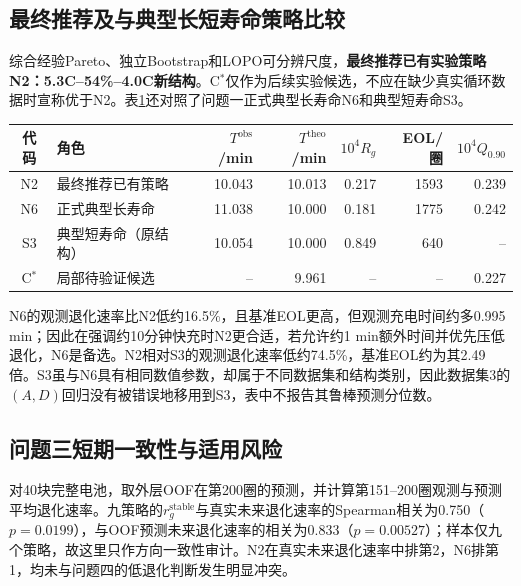 \documentclass[withoutpreface]{cumcmthesis}
\begin{document}
\subsection{最终推荐及与典型长短寿命策略比较}

综合经验Pareto、独立Bootstrap和LOPO可分辨尺度，\textbf{最终推荐已有实验策略N2：5.3C--54\%--4.0C新结构}。C$^*$仅作为后续实验候选，不应在缺少真实循环数据时宣称优于N2。表\ref{tab:q4recommend}还对照了问题一正式典型长寿命N6和典型短寿命S3。

\begin{table}[H]
\centering
\footnotesize
{}
\begin{tabular}{clrrrrr}
\toprule
\rowcolor{TableHeader}
代码 & 角色 & $T^{\mathrm{obs}}$/min & $T^{\mathrm{theo}}$/min & $10^4R_g$ & EOL/圈 & $10^4Q_{0.90}$ \\
\midrule
N2 & 最终推荐已有策略 & 10.043 & 10.013 & 0.217 & 1593 & 0.239 \\
N6 & 正式典型长寿命 & 11.038 & 10.000 & 0.181 & 1775 & 0.242 \\
S3 & 典型短寿命（原结构） & 10.054 & 10.000 & 0.849 & 640 & -- \\
C$^*$ & 局部待验证候选 & -- & 9.961 & -- & -- & 0.227 \\
\bottomrule
\end{tabular}
\label{tab:q4recommend}
\end{table}

N6的观测退化速率比N2低约16.5\%，且基准EOL更高，但观测充电时间约多0.995 min；因此在强调约10分钟快充时N2更合适，若允许约1 min额外时间并优先压低退化，N6是备选。N2相对S3的观测退化速率低约74.5\%，基准EOL约为其2.49倍。S3虽与N6具有相同数值参数，却属于不同数据集和结构类别，因此数据集3的$(A,D)$回归没有被错误地移用到S3，表中不报告其鲁棒预测分位数。

\subsection{问题三短期一致性与适用风险}

对40块完整电池，取外层OOF在第200圈的预测，并计算第151--200圈观测与预测平均退化速率。九策略的$r_g^{\mathrm{stable}}$与真实未来退化速率的Spearman相关为0.750（$p=0.0199$），与OOF预测未来退化速率的相关为0.833（$p=0.00527$）；样本仅九个策略，故这里只作方向一致性审计。N2在真实未来退化速率中排第2，N6排第1，均未与问题四的低退化判断发生明显冲突。
\end{document}
